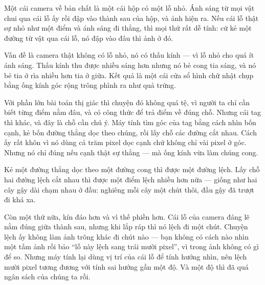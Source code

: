 \documentclass[../../marker.tex]{subfiles}
\begin{document}
\begin{traloi}
\end{traloi}

\begin{dongian}
Một cái camera về bản chất là một cái hộp có một lỗ nhỏ. Ánh sáng từ mọi vật chui qua cái lỗ ấy rồi đập vào thành sau của hộp, và ảnh hiện ra. Nếu cái lỗ thật sự nhỏ như một điểm và ánh sáng đi thẳng, thì mọi thứ rất dễ tính: cứ kẻ một đường từ vật qua cái lỗ, nó đập vào đâu thì ảnh ở đó.

Vấn đề là camera thật không có lỗ nhỏ, nó có thấu kính --- vì lỗ nhỏ cho quá ít ánh sáng. Thấu kính thu được nhiều sáng hơn nhưng nó bẻ cong tia sáng, và nó bẻ tia ở rìa nhiều hơn tia ở giữa. Kết quả là một cái cửa sổ hình chữ nhật chụp bằng ống kính góc rộng trông phình ra như quả trứng.

Với phần lớn bài toán thị giác thì chuyện đó không quá tệ, vì người ta chỉ cần biết từng điểm nằm đâu, và có công thức để trả điểm về đúng chỗ. Nhưng cái tag thì khác, và đây là chỗ cần chú ý. Máy tính tìm góc của tag bằng cách nhìn bốn cạnh, kẻ bốn đường thẳng dọc theo chúng, rồi lấy chỗ các đường cắt nhau. Cách ấy rất khôn vì nó dùng cả trăm pixel dọc cạnh chứ không chỉ vài pixel ở góc. Nhưng nó chỉ đúng nếu cạnh thật sự thẳng --- mà ống kính vừa làm chúng cong.

Kẻ một đường thẳng dọc theo một đường cong thì được một đường lệch. Lấy chỗ hai đường lệch cắt nhau thì được một điểm lệch nhiều hơn nữa --- giống như hai cây gậy dài chạm nhau ở đầu: nghiêng mỗi cây một chút thôi, đầu gậy đã trượt đi khá xa.

Còn một thứ nữa, kín đáo hơn và vì thế phiền hơn. Cái lỗ của camera đáng lẽ nằm đúng giữa thành sau, nhưng khi lắp ráp thì nó lệch đi một chút. Chuyện lệch ấy không làm ảnh trông khác đi chút nào --- bạn không có cách nào nhìn một tấm ảnh rồi bảo ``lỗ này lệch sang trái mười pixel'', vì trong ảnh không có gì để so. Nhưng máy tính lại dùng vị trí của cái lỗ để tính hướng nhìn, nên lệch mười pixel tương đương với tính sai hướng gần một độ. Và một độ thì đã quá ngân sách của chúng ta rồi.


\end{dongian}
\end{document}
